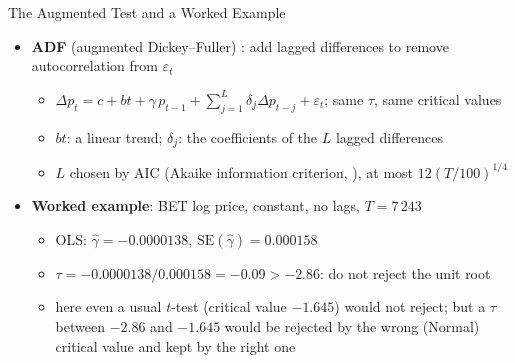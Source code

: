 \begin{frame}{The Augmented Test and a Worked Example}
\itemsize{\small}
\begin{itemize}
    \item \textbf{ADF} (augmented Dickey--Fuller) : add lagged differences to remove autocorrelation from $\varepsilon_t$
    \begin{itemize}
        \item $\Delta p_t = c + bt + \gamma\, p_{t-1} + \sum_{j=1}^{L} \delta_j \Delta p_{t-j} + \varepsilon_t$; same $\tau$, same critical values
        \item $bt$: a linear trend; $\delta_j$: the coefficients of the $L$ lagged differences
        \item $L$ chosen by AIC (Akaike information criterion, ), at most $12(T/100)^{1/4}$
    \end{itemize}
    \item \textbf{Worked example}: BET log price, constant, no lags, $T = 7\,243$
    \begin{itemize}
        \item OLS: $\hat\gamma = -0.0000138$, $\mathrm{SE}(\hat\gamma) = 0.000158$
        \item $\tau = -0.0000138/0.000158 = -0.09 > -2.86$: do not reject the unit root
        \item here even a usual $t$-test (critical value $-1.645$) would not reject; but a $\tau$ between $-2.86$ and $-1.645$ would be rejected by the wrong (Normal) critical value and kept by the right one
    \end{itemize}
\end{itemize}
\end{frame}

